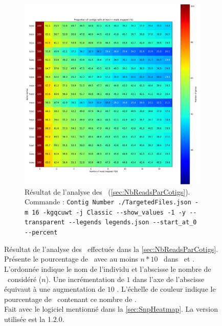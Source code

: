\documentclass[../main]{subfiles} %
\begin{document}
\begin{landscape}
\begin{figure}[p]
\begin{subfigure}[b]{0.55\paperwidth}
        \includegraphics[width=\textwidth]{../Illustrations/Mo_Percent_Contig_Heatmap_global.png}
       \caption{Résultat de l'analyse des \BamTrMo (\ref{sec:NbReadsParCotigs}).\\
        Commande : \lstinline{Contig Number ./TargetedFiles.json -m 16 -kgqcuwt -j Classic --show_values -1 -y --transparent --legends legends.json --start_at_0 --percent}  
        }
        \label{fig:ContigsMoPercent}
    \end{subfigure}
    
    \caption{Résultat de l'analyse des \bam effectuée dans la \ref{sec:NbReadsParCotigs}. Présente le pourcentage de \contigs avec au moins $n * 10$ \reads dans \BamTrEx et \BamTrMo. L'ordonnée indique le nom de l'individu et l'abscisse le nombre de \reads considéré ($n$). Une incrémentation de $1$ dans l'axe de l'abscisse équivaut à une augmentation de $10$ \reads. L'échelle de couleur indique le pourcentage de \contigs contenant ce nombre de \reads. \\ Fait avec le logiciel mentionné dans la \ref{sec:SnpHeatmap}. La version utilisée est la 1.2.0.}
    \label{fig:ContigPercentHeatmap}
    
\end{figure}
\end{landscape}
\restoregeometry
\end{document}
